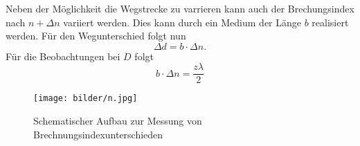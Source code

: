 Neben der Möglichkeit die Wegstrecke zu varrieren kann auch der Brechungsindex nach $n+\Delta n$ variiert werden. 
Dies kann durch ein Medium der Länge $b$ realisiert werden.
Für den Wegunterschied folgt nun
\begin{equation}
    \Delta d =b\cdot \Delta n. \nonumber
\end{equation}
Für die Beobachtungen bei $D$ folgt
\begin{equation}
    b\cdot \Delta n = \frac{z\lambda}{2} \label{eqn:Brechungsindexaenderung}
\end{equation}
\begin{figure}
    \centering
    \texttt{[image: bilder/n.jpg]}
    \caption{Schematischer Aufbau zur Messung von Brechnungsindexunterschieden \cite[5]{anleitung}}
\end{figure}
\label{sec:theorie}